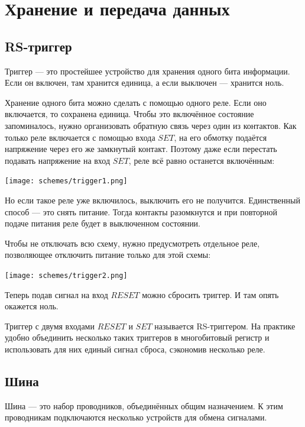 

\chapter{Хранение и передача данных}


\section{RS-триггер}

Триггер --- это простейшее устройство для хранения одного бита информации.
Если он включен, там хранится единица, а если выключен --- хранится ноль.

Хранение одного бита можно сделать с помощью одного реле.
Если оно включается, то сохранена единица.
Чтобы это включённое состояние запоминалось, нужно организовать обратную
связь через один из контактов. Как только реле включается с помощью
входа $SET$, на его
обмотку подаётся напряжение через его же замкнутый контакт. Поэтому даже
если перестать подавать напряжение на вход $SET$, реле всё равно останется включённым:

\begin{center}
\texttt{[image: schemes/trigger1.png]}
\end{center}

Но если такое реле уже включилось, выключить его не получится. Единственный способ ---
это снять питание. Тогда контакты разомкнутся и при повторной подаче питания реле будет
в выключенном состоянии.

Чтобы не отключать всю схему, нужно предусмотреть отдельное реле, позволяющее
отключить питание только для этой схемы:

\begin{center}
\texttt{[image: schemes/trigger2.png]}
\end{center}

Теперь подав сигнал на вход $RESET$ можно сбросить триггер. И там опять окажется ноль.

Триггер с двумя входами $RESET$ и $SET$ называется RS-триггером.
На практике удобно объединить несколько таких триггеров в многобитовый регистр
и использовать для них единый сигнал сброса, сэкономив несколько реле.

\section{Шина}

Шина --- это набор проводников, объединённых общим назначением.
К этим проводникам подключаются несколько устройств для обмена сигналами.

